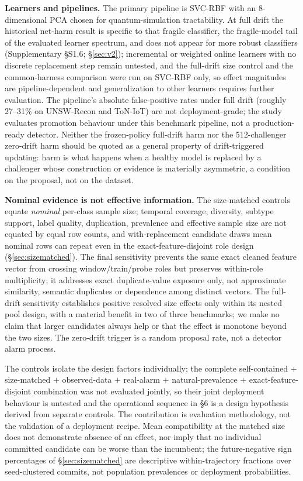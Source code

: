 \documentclass[journal]{IEEEtran}
\begin{document}
\textbf{Learners and pipelines.} The primary pipeline is SVC-RBF with an 8-dimensional PCA chosen for quantum-simulation tractability. At full drift the historical net-harm result is specific to that fragile classifier, the fragile-model tail of the evaluated learner spectrum, and does not appear for more robust classifiers (Supplementary \S S1.6; \S\ref{sec:v2}); incremental or weighted online learners with no discrete replacement step remain untested, and the full-drift size control and the common-harness comparison were run on SVC-RBF only, so effect magnitudes are pipeline-dependent and generalization to other learners requires further evaluation. The pipeline's absolute false-positive rates under full drift (roughly 27--31\% on UNSW-Recon and ToN-IoT) are not deployment-grade; the study evaluates promotion behaviour under this benchmark pipeline, not a production-ready detector. Neither the frozen-policy full-drift harm nor the 512-challenger zero-drift harm should be quoted as a general property of drift-triggered updating: harm is what happens when a healthy model is replaced by a challenger whose construction or evidence is materially asymmetric, a condition on the proposal, not on the dataset.

\textbf{Nominal evidence is not effective information.} The size-matched controls equate \emph{nominal} per-class sample size; temporal coverage, diversity, subtype support, label quality, duplication, prevalence and effective sample size are not equated by equal row counts, and with-replacement candidate draws mean nominal rows can repeat even in the exact-feature-disjoint role design (\S\ref{sec:sizematched}). The final sensitivity prevents the same exact cleaned feature vector from crossing window/train/probe roles but preserves within-role multiplicity; it addresses exact duplicate-value exposure only, not approximate similarity, semantic duplicates or dependence among distinct vectors. The full-drift sensitivity establishes positive resolved size effects only within its nested pool design, with a material benefit in two of three benchmarks; we make no claim that larger candidates always help or that the effect is monotone beyond the two sizes. The zero-drift trigger is a random proposal rate, not a detector alarm process.

The controls isolate the design factors individually; the complete self-contained $+$ size-matched $+$ observed-data $+$ real-alarm $+$ natural-prevalence $+$ exact-feature-disjoint combination was not evaluated jointly, so their joint deployment behaviour is untested and the operational sequence in \S6 is a design hypothesis derived from separate controls. The contribution is evaluation methodology, not the validation of a deployment recipe. Mean compatibility at the matched size does not demonstrate absence of an effect, nor imply that no individual committed candidate can be worse than the incumbent; the future-negative sign percentages of \S\ref{sec:sizematched} are descriptive within-trajectory fractions over seed-clustered commits, not population prevalences or deployment probabilities.
\end{document}
